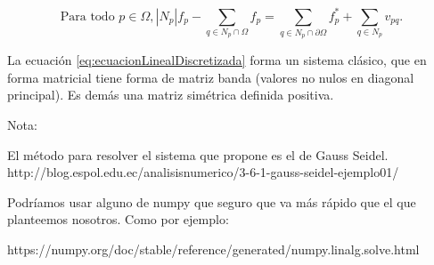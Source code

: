 \documentclass[11pt,a4paper]{article}
\begin{document}
\begin{equation}\label{eq:ecuacionLinealDiscretizada}
    \text{Para todo } p \in \Omega, |N_p| f_p - \sum_{q \in N_p \cap \Omega} f_p = \sum_{q \in N_p \cap \partial \Omega} f^*_p + \sum_{q \in N_p } v_{pq}.
\end{equation}

La ecuación  \ref{eq:ecuacionLinealDiscretizada} forma un sistema clásico, que en forma matricial tiene forma de matriz banda (valores no nulos en diagonal principal). 
Es demás una matriz simétrica definida positiva. 



Nota: 

El método para resolver el sistema que propone es el de Gauss Seidel. 
http://blog.espol.edu.ec/analisisnumerico/3-6-1-gauss-seidel-ejemplo01/

Podríamos usar alguno de numpy que seguro que va más rápido que el que planteemos nosotros. 
Como por ejemplo: 

https://numpy.org/doc/stable/reference/generated/numpy.linalg.solve.html
\end{document}
